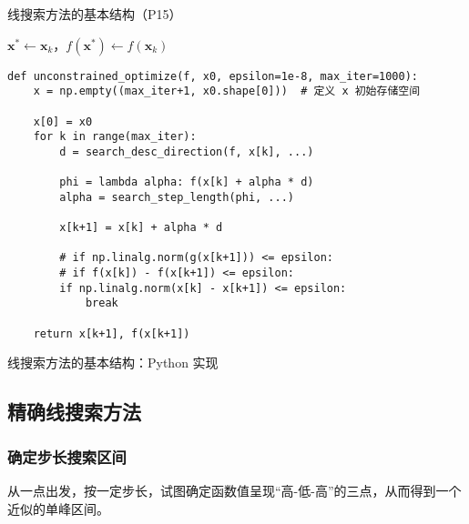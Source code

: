 \documentclass[cn,mtpro2,12pt]{elegantbook}
\begin{document}
\begin{algorithm}
    \caption{线搜索方法的基本结构（P15）}
    $\mathbf{x}^{*}\leftarrow\mathbf{x}_{k}$，$f\left(\mathbf{x}^{*}\right)\leftarrow f\left(\mathbf{x}_{k}\right)$\;
\end{algorithm}

\begin{listing}
    \begin{verbatim}
def unconstrained_optimize(f, x0, epsilon=1e-8, max_iter=1000):
    x = np.empty((max_iter+1, x0.shape[0]))  # 定义 x 初始存储空间

    x[0] = x0
    for k in range(max_iter):
        d = search_desc_direction(f, x[k], ...)

        phi = lambda alpha: f(x[k] + alpha * d)
        alpha = search_step_length(phi, ...)

        x[k+1] = x[k] + alpha * d

        # if np.linalg.norm(g(x[k+1])) <= epsilon:
        # if f(x[k]) - f(x[k+1]) <= epsilon:
        if np.linalg.norm(x[k] - x[k+1]) <= epsilon:
            break

    return x[k+1], f(x[k+1])
    \end{verbatim}
    \caption{线搜索方法的基本结构：Python 实现}
\end{listing}

\subsection{精确线搜索方法}

\subsubsection{确定步长搜索区间}

从一点出发，按一定步长，试图确定函数值呈现“高-低-高”的三点，从而得到一个近似的单峰区间。
\end{document}
